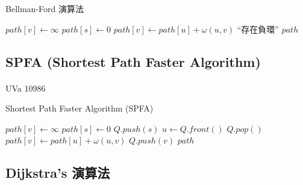 \documentclass[12pt,a4paper,oneside]{report}
\begin{document}
\begin{CJK}{UTF8}{bkai}
\begin{algorithm}
\label{algo-bellman-ford}
\caption{Bellman-Ford 演算法}
\begin{algorithmic}[1]
  \State{}
    \State $path[v]\gets\infty$
  \EndFor
  \State $path[s]\gets{0}$
        \State $path[v]\gets{path[u]+\omega{(u,v)}}$
      \EndIf
    \EndFor
  \EndFor
      \State \Return ``存在負環''
    \EndIf
  \EndFor
  \State \Return $path$
\EndProcedure
\end{algorithmic}
\end{algorithm}

\subsection{SPFA (Shortest Path Faster Algorithm)}
\paragraph{}UVa 10986
\begin{algorithm}
\label{algo-spfa}
\caption{Shortest Path Faster Algorithm (SPFA)}
\begin{algorithmic}[1]
  \State{}
    \State $path[v]\gets\infty$
  \EndFor
  \State $path[s]\gets{0}$
  \State $Q.push(s)$
    \State $u\gets{Q.front()}$
    \State $Q.pop()$
        \State $path[v]\gets{path[u]+\omega{(u,v)}}$
          \State $Q.push(v)$
        \EndIf
      \EndIf
    \EndFor
  \EndWhile
  \State \Return $path$
\EndProcedure
\end{algorithmic}
\end{algorithm}

\subsection{Dijkstra's 演算法}


\end{CJK}
\end{document}
